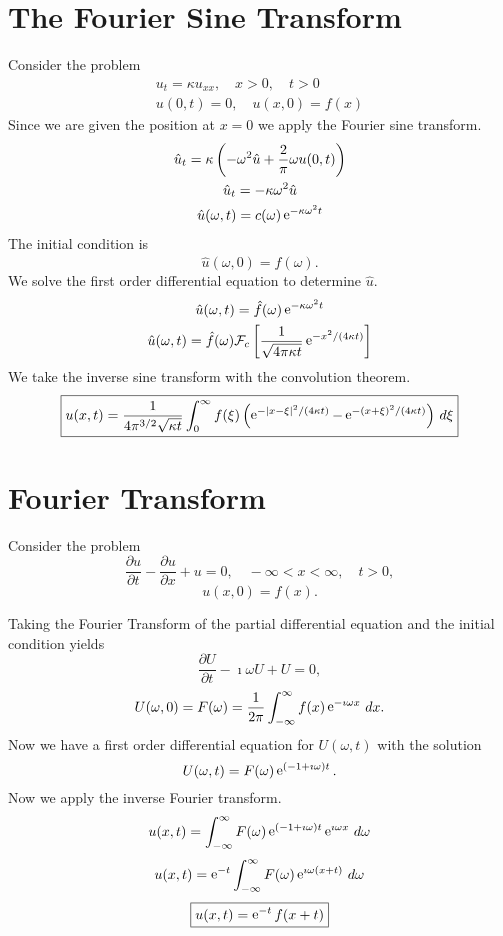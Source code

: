 \section{The Fourier Sine Transform}

Consider the problem
\begin{gather*}
  u_t = \kappa u_{x x}, \quad x > 0, \quad t > 0 \\
  u(0,t) = 0, \quad u(x,0) = f(x)
\end{gather*}
Since we are given the position at $x=0$ we apply the Fourier
sine transform.
\begin{gather*}
  \hat{u}_t = \kappa \left(-\omega^2 \hat{u} 
    + \frac{2}{\pi} \omega u(0,t) \right) \\
  \hat{u}_t = - \kappa \omega^2 \hat{u} \\
  \hat{u}(\omega,t) = c(\omega) \mathop{\mathrm{e}}\nolimits^{-\kappa \omega^2 t}
\end{gather*}
The initial condition is
\[ 
\hat{u}(\omega,0) = \hat{f}(\omega).
\]
We solve the first order differential equation to determine $\hat{u}$.
\begin{gather*}
  \hat{u}(\omega,t) = \hat{f}(\omega) \mathop{\mathrm{e}}\nolimits^{-\kappa \omega^2 t} \\ 
  \hat{u}(\omega,t) = \hat{f}(\omega) \mathcal{F}_c \left[
    \frac{ 1 }{ \sqrt{ 4 \pi \kappa t } } 
    \mathop{\mathrm{e}}\nolimits^{ -x^2 / (4 \kappa t) } \right]
\end{gather*}
We take the inverse sine transform with the convolution theorem.
\[
\boxed{
  u(x,t) = \frac{ 1 }{ 4 \pi^{3/2} \sqrt{ \kappa t } } 
  \int_0^\infty f(\xi) \left( \mathop{\mathrm{e}}\nolimits^{ -|x-\xi|^2 / (4 \kappa t) }
    - \mathop{\mathrm{e}}\nolimits^{ -(x+\xi)^2 / (4 \kappa t) } \right) \,d \xi
  }
\]



\section{Fourier Transform}

Consider the problem
\[
\frac{\partial u}{\partial t} - \frac{\partial u}{\partial x} + u = 0, \quad -\infty < x < \infty, 
\quad t > 0,
\]
\[
u(x,0) = f(x).
\]

Taking the Fourier Transform of the partial differential equation and 
the initial condition yields
\[
\frac{\partial U}{\partial t} - \imath \omega U + U = 0,
\]
\[
U(\omega,0) = F(\omega) = \frac{1}{2\pi} \int_{-\infty}^\infty f(x) \mathop{\mathrm{e}}\nolimits^{-\imath \omega x}\,d x.
\]
Now we have a first order differential equation for $U(\omega,t)$ with 
the solution
\[
U(\omega,t) = F(\omega) \mathop{\mathrm{e}}\nolimits^{(-1+ \imath \omega) t}.
\]
Now we apply the inverse Fourier transform.
\[
u(x,t) = \int_{-\infty}^\infty F(\omega) \mathop{\mathrm{e}}\nolimits^{(-1+ \imath \omega) t} \mathop{\mathrm{e}}\nolimits^{\imath \omega x}\,d\omega
\]
\[
u(x,t) = \mathop{\mathrm{e}}\nolimits^{-t} \int_{-\infty}^\infty F(\omega) \mathop{\mathrm{e}}\nolimits^{\imath \omega (x+t)} \,d\omega
\]
\[
\boxed{
  u(x,t) = \mathop{\mathrm{e}}\nolimits^{-t} f(x+t)
  }
\]








